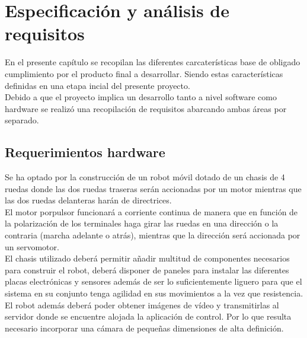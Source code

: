 

\newpage

\chapter[Requisitos]{Especificación y análisis de requisitos}
\label{chap:requisitos}

En el presente capítulo se recopilan las diferentes carcaterísticas base de obligado cumplimiento por el producto final a desarrollar. Siendo estas características definidas en una
etapa incial del presente proyecto. \\

Debido a que el proyecto implica un desarrollo tanto a nivel software como hardware se realizó una recopilación de requisitos abarcando ambas áreas por separado.\\

\section{Requerimientos hardware}
\label{sec:requerimientos-hardware}

Se ha optado por la construcción de un robot móvil dotado de un chasis de 4 ruedas donde las dos ruedas traseras serán accionadas por un motor mientras que las dos ruedas delanteras
harán de directrices.\\

El motor porpulsor funcionará a corriente continua de manera que en función de la polarización de los terminales haga girar las ruedas en una dirección o la contraria (marcha adelante o atrás), mientras que 
la dirección será accionada por un servomotor.\\

El chasis utilizado deberá permitir añadir multitud de componentes necesarios para construir el robot, deberá disponer de paneles para instalar las diferentes
placas electrónicas y sensores además de ser lo suficientemente liguero para que el sistema en su conjunto tenga agilidad en sus movimientos a la vez que resistencia.\\

El robot además deberá poder obtener imágenes de vídeo y transmitirlas al servidor donde se encuentre alojada la aplicación de control. Por lo que resulta necesario incorporar una cámara de 
pequeñas dimensiones de alta definición.\\

